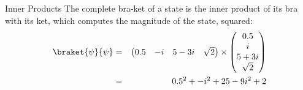\begin{frame}{Inner Products}
The complete bra-ket of a state is the inner product of its bra with its ket, which computes the magnitude of the state, squared:
\begin{eqnarray*}
\braket{\psi}{\psi} & = &
\begin{pmatrix}
0.5 & -i & 5-3i &  \sqrt{2}
\end{pmatrix}
\times\begin{pmatrix}
0.5\\ i \\ 5+3i \\ \sqrt{2}
\end{pmatrix}
\\
 & = & 0.5^{2} + -i^{2} + 25-9i^{2} + 2 
\end{eqnarray*}
    
\end{frame}


